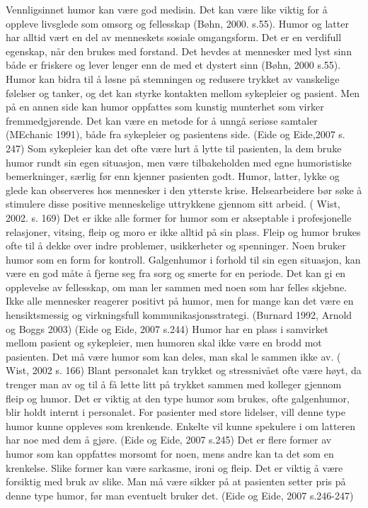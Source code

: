 Vennligsinnet humor kan være god medisin. Det kan være like viktig for å
oppleve livsglede som omsorg og fellesskap (Bøhn, 2000. s.55). Humor og latter
har alltid vært en del av menneskets sosiale omgangsform. Det er en verdifull
egenskap, når den brukes med forstand. Det hevdes at mennesker med lyst sinn
både er friskere og lever lenger enn de med et dystert sinn (Bøhn, 2000 s.55).
Humor kan bidra til å løsne på stemningen og redusere trykket av vanskelige
følelser og tanker, og det kan styrke kontakten mellom sykepleier og pasient.
Men på en annen side kan humor oppfattes som kunstig munterhet som virker
fremmedgjørende. Det kan være en metode for å unngå seriøse samtaler (MEchanic
1991), både fra sykepleier og pasientens side. (Eide og Eide,2007 s. 247) Som
sykepleier kan det ofte være lurt å lytte til pasienten, la dem bruke humor
rundt sin egen situasjon, men være tilbakeholden med egne humoristiske
bemerkninger, særlig før enn kjenner pasienten godt. Humor, latter, lykke og
glede kan observeres hos mennesker i den ytterste krise. Helsearbeidere bør
søke å stimulere disse positive menneskelige uttrykkene gjennom sitt arbeid.  (
Wist, 2002. s. 169) Det er ikke alle former for humor som er akseptable i
profesjonelle relasjoner, vitsing, fleip og moro er ikke alltid på sin plass.
Fleip og humor brukes ofte til å dekke over indre problemer, usikkerheter og
spenninger. Noen bruker humor som en form for kontroll. Galgenhumor i forhold
til sin egen situasjon, kan være en god måte å fjerne seg fra sorg og smerte
for en periode. Det kan gi en opplevelse av fellesskap, om man ler sammen med
noen som har felles skjebne. Ikke alle mennesker reagerer positivt på humor,
men for mange kan det være en hensiktsmessig og virkningsfull
kommunikasjonsstrategi. (Burnard 1992, Arnold og Boggs 2003) (Eide og Eide,
2007 s.244) Humor har en plass i samvirket mellom pasient og sykepleier, men
humoren skal ikke være en brodd mot pasienten. Det må være humor som kan deles,
man skal le sammen ikke av. ( Wist, 2002 s. 166) Blant personalet kan trykket
og stressnivået ofte være høyt, da trenger man av og til å få lette litt på
trykket sammen med kolleger gjennom fleip og humor. Det er viktig at den type
humor som brukes, ofte galgenhumor, blir holdt internt i
personalet. For pasienter med store lidelser, vill denne type humor kunne
oppleves som krenkende. Enkelte vil kunne spekulere i om latteren har noe med
dem å gjøre.  (Eide og Eide, 2007 s.245) Det er flere former av humor som kan
oppfattes morsomt for noen, mens andre kan ta det som en krenkelse. Slike
former kan være sarkasme, ironi og fleip. Det er viktig å være forsiktig med
bruk av slike. Man må være sikker på at pasienten setter pris på denne type
humor, før man eventuelt bruker det. (Eide og Eide, 2007 s.246-247)

